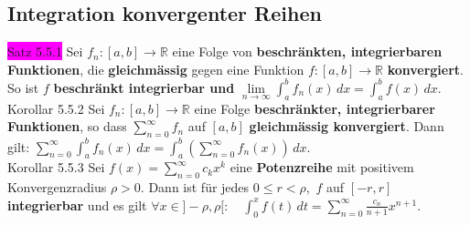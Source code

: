 \documentclass[landscape, 10pt]{article}
\newcommand{\R}{\mathbb{R}}
\begin{document}
\begin{multicols}{3}
       \subsection{Integration konvergenter Reihen}
              \colorbox{magenta}{Satz 5.5.1} 
                     Sei \textcolor{NavyBlue}{$f_n:[a,b]\longrightarrow\R$} 
                     eine Folge von \textbf{beschränkten, integrierbaren Funktionen}, 
                     die \textbf{gleichmässig} gegen 
                     eine Funktion 
                     \textcolor{NavyBlue}{$f:[a,b]\longrightarrow\R$} 
                     \textbf{konvergiert}.
                     So ist \textcolor{NavyBlue}{$f$} 
                     \textbf{beschränkt integrierbar und} 
                     \textcolor{NavyBlue}{
                     $\lim\limits_{n\to\infty}\int_a^bf_n(x)\,dx =\int_a^bf(x)\,dx$}.\\
              \colorbox{BurntOrange}{Korollar 5.5.2} Sei 
                     \textcolor{NavyBlue}{$f_n:[a,b]\longrightarrow\R$} eine Folge 
                     \textbf{beschränkter, integrierbarer Funktionen}, so dass 
                     \textcolor{NavyBlue}{$\sum_{n=0}^\infty f_n$} auf 
                     \textcolor{NavyBlue}{$[a,b]$}
                     \textbf{gleichmässig konvergiert}. Dann gilt: 
                     \textcolor{NavyBlue}{$\sum_{n=0}^\infty\int_a^bf_n(x)\,dx
                     =\int_a^b(\sum_{n=0}^\infty f_n(x))\,dx$}. \\
              \colorbox{BurntOrange}{Korollar 5.5.3} 
                     Sei \textcolor{NavyBlue}{$f(x)=\sum_{n=0}^\infty c_kx^k$} 
                     eine \textbf{Potenzreihe} mit positivem Konvergenzradius 
                     \textcolor{NavyBlue}{$\rho>0$}. Dann ist für jedes 
                     \textcolor{NavyBlue}{$0\leqslant r<\rho$},\,
                     \textcolor{NavyBlue}{$f$} 
                     auf \textcolor{NavyBlue}{$[-r,r]$}
                     \textbf{integrierbar} und es gilt 
                     \textcolor{NavyBlue}{$\forall x\in]-\rho,\rho[:\quad
                     \int_0^xf(t)\,dt
                     =\sum_{n=0}^\infty\frac{c_n}{n+1}x^{n+1}$}.

\end{multicols}
\end{document}
